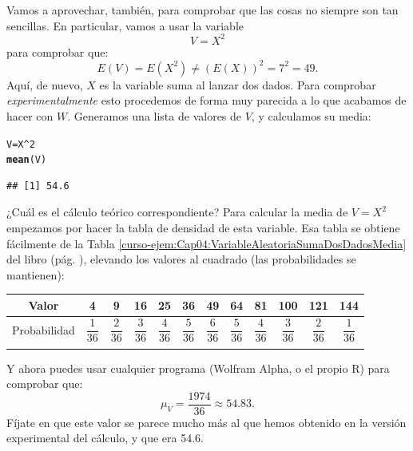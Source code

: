 \documentclass[10pt,a4paper]{article}\usepackage[]{graphicx}\usepackage[]{color}
\makeatletter
\newcommand{\hlnum}[1]{\textcolor[rgb]{0.686,0.059,0.569}{#1}}%
\newcommand{\hlopt}[1]{\textcolor[rgb]{0,0,0}{#1}}%
\newcommand{\hlstd}[1]{\textcolor[rgb]{0.345,0.345,0.345}{#1}}%
\newcommand{\hlkwb}[1]{\textcolor[rgb]{0.69,0.353,0.396}{#1}}%
\newcommand{\hlkwd}[1]{\textcolor[rgb]{0.737,0.353,0.396}{\textbf{#1}}}%
\newenvironment{kframe}{%
 \def\at@end@of@kframe{}%
 \ifinner\ifhmode%
  \def\at@end@of@kframe{\end{minipage}}%
  \begin{minipage}{\columnwidth}%
 \fi\fi%
 \def\FrameCommand##1{\hskip\@totalleftmargin \hskip-\fboxsep
 \colorbox{shadecolor}{##1}\hskip-\fboxsep
     \hskip-\linewidth \hskip-\@totalleftmargin \hskip\columnwidth}%
 \MakeFramed {\advance\hsize-\width
   \@totalleftmargin\z@ \linewidth\hsize
   \@setminipage}}%
 {\par\unskip\endMakeFramed%
 \at@end@of@kframe}
\newenvironment{knitrout}{}{} %
\makeatother
\begin{document}
Vamos a aprovechar, también, para comprobar que las cosas no siempre son tan sencillas. En particular, vamos a usar la variable
\[V = X^2\]
para comprobar que:
\[E(V) = E(X^2) \neq (E(X))^2 = 7^2 = 49.\]
Aquí, de nuevo, $X$ es la variable suma al lanzar dos dados. Para comprobar {\em experimentalmente} esto procedemos de forma muy parecida a lo que acabamos de hacer con $W$. Generamos una lista de valores de $V$, y calculamos su media:
\begin{knitrout}
\color{fgcolor}\begin{kframe}
\begin{alltt}
\hlstd{V} \hlkwb{=} \hlstd{X}\hlopt{^}\hlnum{2}
\hlkwd{mean}\hlstd{(V)}
\end{alltt}
\begin{verbatim}
## [1] 54.6
\end{verbatim}
\end{kframe}
\end{knitrout}
¿Cuál es el cálculo teórico correspondiente? Para calcular la media de $V = X^2$ empezamos por hacer la tabla de densidad de esta variable. Esa tabla se obtiene fácilmente de la Tabla \ref{curso-ejem:Cap04:VariableAleatoriaSumaDosDadosMedia} del libro (pág. \pageref{curso-ejem:Cap04:VariableAleatoriaSumaDosDadosMedia}), elevando los valores al cuadrado (las probabilidades se mantienen):

\begin{center}
    {\small
    \begin{tabular}[t]{|c|c|c|c|c|c|c|c|c|c|c|c|}
    \hline
    Valor\rule{0cm}{0.5cm}
    &4&9&16&25&36&49&64&81&100&121&144\\
    \hline
    Probabilidad\rule{0cm}{0.7cm}
    &$\dfrac{1}{36}$&$\dfrac{2}{36}$&$\dfrac{3}{36}$&$\dfrac{4}{36}$&$\dfrac{5}{36}$&$\dfrac{6}{36}$&$\dfrac{5}{36}$&$\dfrac{4}{36}$&$\dfrac{3}{36}$&$\dfrac{2}{36}$&$\dfrac{1}{36}$\\
    &&&&&&&&&&&\\
    \hline
    \end{tabular}
    }
\end{center}
Y ahora puedes usar cualquier programa (Wolfram Alpha, o el propio R) para comprobar que:
\[\mu_V = \dfrac{1974}{36} \approx 54.83.\]
Fíjate en que este valor se parece mucho más al que hemos obtenido en la versión experimental del cálculo, y que era 54.6.
\end{document}
